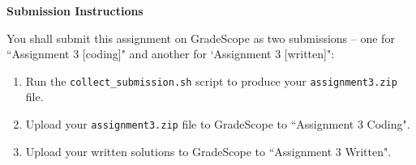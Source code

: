 \Large{\textbf{Submission Instructions}}

\normalsize
You shall submit this assignment on GradeScope as two submissions -- one for ``Assignment 3 [coding]" and another for `Assignment 3 [written]":
\begin{enumerate}
    \item Run the \texttt{collect\_submission.sh} script to produce your \texttt{assignment3.zip} file.
    \item Upload your \texttt{assignment3.zip} file to GradeScope to ``Assignment 3 Coding".
    \item Upload your written solutions to GradeScope to ``Assignment 3 Written".
\end{enumerate}